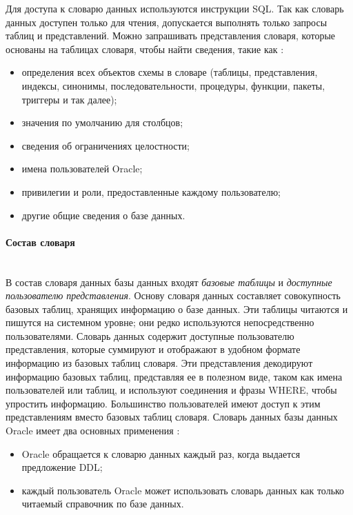 Для доступа к словарю данных используются инструкции SQL. Так как словарь данных доступен только для чтения, допускается выполнять только запросы таблиц и представлений.
Можно запрашивать представления словаря, которые основаны на таблицах словаря, чтобы найти сведения, такие как \autocite{Oracle}:
\begin{itemize}
\item определения всех объектов схемы в словаре (таблицы, представления, индексы, синонимы, последовательности, процедуры, функции, пакеты, триггеры и так далее);
\item значения по умолчанию для столбцов;
\item сведения об ограничениях целостности;
\item имена пользователей Oracle;
\item привилегии и роли, предоставленные каждому пользователю;
\item другие общие сведения о базе данных.
\end{itemize}

\paragraph{Состав словаря} ~\\

В состав словаря данных базы данных входят \textit{базовые таблицы} и \textit{доступные
пользователю представления}.
Основу словаря данных составляет совокупность базовых таблиц, хранящих
информацию о базе данных. Эти таблицы читаются и пишутся на системном
уровне; они редко используются непосредственно пользователями.
Словарь данных содержит доступные пользователю представления, которые
суммируют и отображают в удобном формате информацию из базовых таблиц словаря. Эти представления декодируют информацию базовых таблиц,
представляя ее в полезном виде, таком как имена пользователей или таблиц,
и используют соединения и фразы WHERE, чтобы упростить информацию.
Большинство пользователей имеют доступ к этим представлениям вместо
базовых таблиц словаря.
Словарь данных базы данных Oracle имеет два основных применения \autocite{Kirillov2009}:
\begin{itemize}
\item Oracle обращается к словарю данных каждый раз, когда выдается предложение DDL;
\item каждый пользователь Oracle может использовать словарь данных как
только читаемый справочник по базе данных.
\end{itemize}

